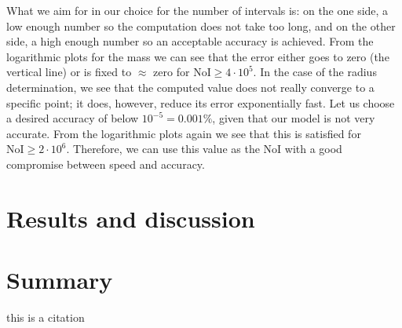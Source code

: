 \documentclass[]{article}
\begin{document}
	What we aim for in our choice for the number of intervals is: on the one side, a low enough number so the computation does not take too long, and on the other side, a high enough number so an acceptable accuracy is achieved. From the logarithmic plots for the mass we can see that the error either goes to zero (the vertical line) or is fixed to $\approx$ zero for $\text{NoI} \geq 4 \cdot 10^5$. In the case of the radius determination, we see that the computed value does not really converge to a specific point; it does, however, reduce its error exponentially fast. Let us choose a desired accuracy of below $10^{-5} = 0.001 \%$, given that our model is not very accurate. From the logarithmic plots again we see that this is satisfied for $\text{NoI} \geq 2 \cdot 10^6$. Therefore, we can use this value as the NoI with a good compromise between speed and accuracy.

\section{Results and discussion}\label{sec:results-and-discussion}


\section{Summary}\label{sec:summary}
this is a citation \cite{Sagert2005}


\renewcommand{\bibname}{References}


	
	

	
\end{document}
